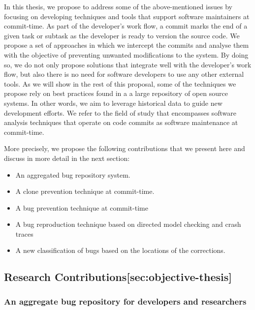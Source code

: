 In this thesis, we propose to address some of the above-mentioned issues
by focusing on developing techniques and tools that support software
maintainers at commit-time. As part of the developer's work flow, a
commit marks the end of a given task or subtask as the developer is
ready to version the source code. We propose a set of approaches in
which we intercept the commits and analyse them with the objective of
preventing unwanted modifications to the system. By doing so, we do not
only propose solutions that integrate well with the developer's work
flow, but also there is no need for software developers to use any other
external tools. As we will show in the rest of this proposal, some of
the techniques we propose rely on best practices found in a a large
repository of open source systems. In other words, we aim to leverage
historical data to guide new development efforts. We refer to the field
of study that encompasses software analysis techniques that operate on
code commits as software maintenance at commit-time.

More precisely, we propose the following contributions that we present
here and discuss in more detail in the next section:

\begin{itemize}
\item
  An aggregated bug repository system.
\item
  A clone prevention technique at commit-time.
\item
  A bug prevention technique at commit-time
\item
  A bug reproduction technique based on directed model checking and
  crash traces
\item
  A new classification of bugs based on the locations of the
  corrections.
\end{itemize}

\subsection{Research
Contributions{[}sec:objective-thesis{]}}\label{research-contributionssecobjective-thesis}

\subsubsection{An aggregate bug repository for developers and
researchers}\label{an-aggregate-bug-repository-for-developers-and-researchers}

